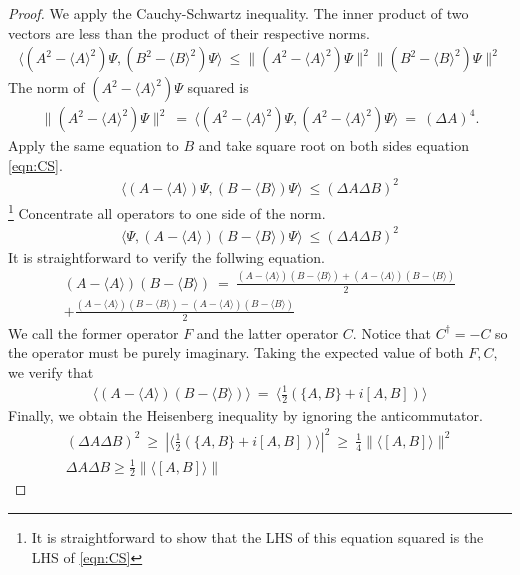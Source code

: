 \documentclass{article}
\numberwithin{equation}{section}
\newcommand{\ExpVal}[1]{
    {
        \langle{#1}\rangle
    }
}
\newcommand{\InProd}[2]{
    {
        \langle{#1, #2}\rangle
    }
}
\begin{document}
\begin{proof}
    We apply the Cauchy-Schwartz inequality. The inner product 
    of two vectors are less than the product of their respective norms. 
    \begin{align}\label{eqn:CS}
        \InProd{(A^2-\ExpVal{A}^2)\Psi}{(B^2-\ExpVal{B}^2)\Psi} \ \leq  
        \|(A^2-\ExpVal{A}^2)\Psi\|^2 \|(B^2-\ExpVal{B}^2)\Psi\|^2
    \end{align}
    The norm of $(A^2-\ExpVal{A}^2)\Psi$ squared is 
    \begin{align}
        \|(A^2-\ExpVal{A}^2)\Psi\|^2 \ = \ \InProd{(A^2-\ExpVal{A}^2)\Psi}{(A^2-\ExpVal{A}^2)\Psi}
        \ = \ (\Delta A)^4. 
    \end{align}
    Apply the same equation to $B$ and take square root on both sides equation \eqref{eqn:CS}. 
    \begin{align}
        \InProd{(A-\ExpVal{A})\Psi}{(B-\ExpVal{B})\Psi} \ \leq (\Delta A\Delta B)^2 
    \end{align}\footnote{It is straightforward to show that the LHS of this equation squared 
    is the LHS of \eqref{eqn:CS}}
    Concentrate all operators to one side of the norm. 
    \begin{align}
        \InProd{\Psi} {(A - \ExpVal A)(B - \ExpVal B)\Psi} \ \leq 
        (\Delta A \Delta B)^2
    \end{align}
    It is straightforward to verify the follwing equation. 
    \begin{align}
        (A - \ExpVal A)(B - \ExpVal B) \ = \ 
        \frac {
            (A - \ExpVal A)(B - \ExpVal B) + (A - \ExpVal A)(B - \ExpVal B)
        } 2\nonumber \\ +
    \frac {
            (A - \ExpVal A)(B - \ExpVal B) - (A - \ExpVal A)(B - \ExpVal B)
        } 2
    \end{align}
    We call the former operator $F$ and the latter operator $C$. 
    Notice that $C^\dag = -C$ so the operator must be purely imaginary. 
    Taking the expected value of both $F, C$, we verify that 
    \begin{align}
        \ExpVal{(A - \ExpVal A)(B - \ExpVal B)} \ = \  
        \ExpVal{
            \frac 1 2\left(\{A, B\} + i [A, B]\right)
        }
    \end{align}
    Finally, we obtain the Heisenberg inequality by ignoring the anticommutator. 
    \begin{align}
        (\Delta A \Delta B)^2 \ \geq \ 
        |\ExpVal{\frac 1 2\left(\{A, B\} + i [A, B]\right)}|^2 \ \geq \ 
        \frac 1 4 \|\ExpVal{[A, B]}\|^2 \\ 
        \Delta A \Delta B \geq \frac 1 2\|\ExpVal{[A, B]}\|
    \end{align}

\end{proof}
\end{document}
